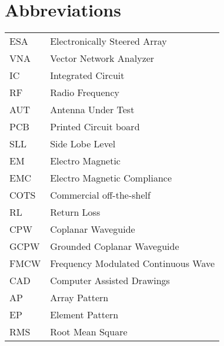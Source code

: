 %
%
%


\chapter*{Abbreviations}
\begingroup
\renewcommand{\arraystretch}{1.2}
\begin{tabular}{@{}p{2.5cm} l}
    ESA     & Electronically Steered Array\\
    VNA     & Vector Network Analyzer\\
    IC      & Integrated Circuit\\
    RF      & Radio Frequency \\
    AUT     & Antenna Under Test\\
    PCB     & Printed Circuit board\\
    SLL     & Side Lobe Level\\
    EM      & Electro Magnetic\\
    EMC     & Electro Magnetic Compliance\\
    COTS    & Commercial off-the-shelf\\
    RL      & Return Loss\\
    CPW     & Coplanar Waveguide\\
    GCPW    & Grounded Coplanar Waveguide\\
    FMCW    & Frequency Modulated Continuous Wave\\
    CAD     & Computer Assisted Drawings\\
    AP      & Array Pattern\\
    EP      & Element Pattern\\
    RMS     & Root Mean Square\\
\end{tabular}
\endgroup
\ifstandalone
% 
\fi
%
